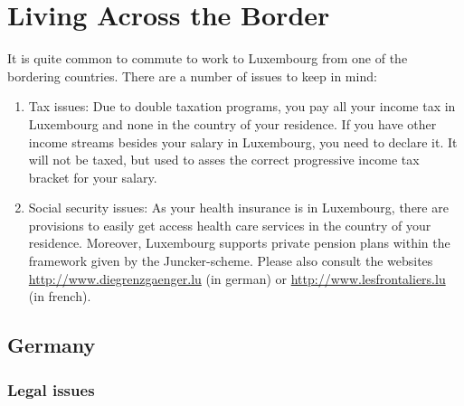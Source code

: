\section{Living Across the Border}

It is quite common to commute to work to Luxembourg from one of the bordering countries. There are a number of issues to keep in mind:
\begin{enumerate}
\item Tax issues: Due to double taxation programs, you pay all your income tax in Luxembourg and none in the country of your residence. If you have other income streams besides your salary in Luxembourg, you need to declare it. It will not be taxed, but used to asses the correct progressive income tax bracket for your salary.
\item Social security issues: As your health insurance is in Luxembourg, there are provisions to easily get access health care services in the country of your residence. Moreover, Luxembourg supports private pension plans within the framework given by the Juncker-scheme.
Please also consult the websites \url{http://www.diegrenzgaenger.lu} (in german) or \url{http://www.lesfrontaliers.lu} (in french).
\end{enumerate}

\subsection{Germany}

\subsubsection{Legal issues}

